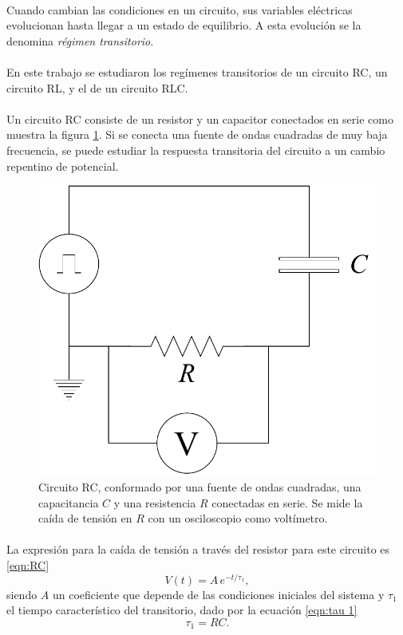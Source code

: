 \paragraph{}
Cuando cambian las condiciones en un circuito, sus variables eléctricas evolucionan hasta llegar a un estado de equilibrio. A esta evolución se la denomina \emph{régimen transitorio}. \cite{apunte_guia4}
\paragraph{}
En este trabajo se estudiaron los regímenes transitorios de un circuito RC, un circuito RL, y el de un circuito RLC. 
\paragraph{}
Un circuito RC consiste de un resistor y un capacitor conectados en serie como muestra la figura \ref{esq: RC}. Si se conecta una fuente de ondas cuadradas de muy baja frecuencia, se puede estudiar la respuesta transitoria del circuito a un cambio repentino de potencial.
\begin{figure}[H]
    \centering
    \includegraphics[scale= 0.45]{Esquemas/RC.drawio.pdf}
    \caption{Circuito RC, conformado por una fuente de ondas cuadradas, una capacitancia $C$ y una resistencia $R$ conectadas en serie. Se mide la caída de tensión en $R$ con un osciloscopio como voltímetro.}
    \label{esq: RC}
\end{figure}
\paragraph{}
La expresión para la caída de tensión a través del resistor para este circuito es \eqref{eqn:RC}
\begin{equation}\label{eqn:RC}
    V(t)=A\,e^{-t/\tau_{1}},
\end{equation}
siendo $A$ un coeficiente que depende de las condiciones iniciales del sistema y $\tau_{1}$ el tiempo característico del transitorio, dado por la ecuación \eqref{eqn:tau 1} \cite{apunte_guia4} 
\begin{equation}\label{eqn:tau 1}
    \tau_{1}=RC.
\end{equation}
